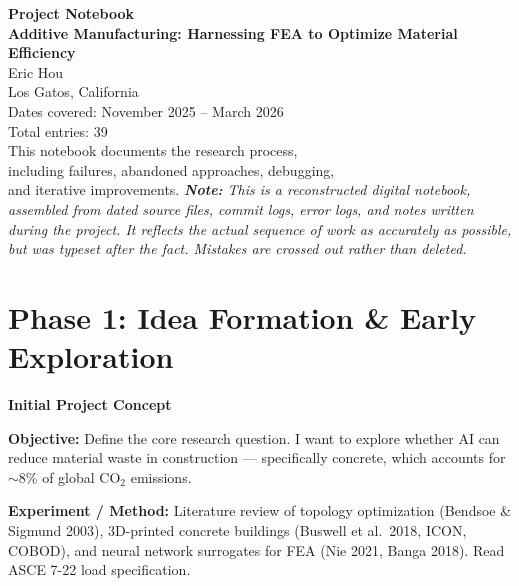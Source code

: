 \documentclass[11pt, letterpaper]{article}
\newcounter{entrynum}
\newcommand{\entry}[2]{%
  \refstepcounter{entrynum}%
  \vspace{6mm}%
  \noindent\begin{tcolorbox}[
    colback=bglight, colframe=entryblue,
    boxrule=1pt, arc=3pt,
    title={\textbf{Entry \theentrynum}\hfill\textbf{#1}},
    fonttitle=\large\color{white},
    colbacktitle=entryblue,
    left=3mm, right=3mm, top=2mm, bottom=2mm
  ]
  {\large\bfseries\color{entryblue} #2}
  \end{tcolorbox}
  \vspace{-1mm}%
}
\newcommand{\objective}{\par\textbf{\color{entryblue}Objective:} }
\newcommand{\experiment}{\par\textbf{\color{entryblue}Experiment / Method:} }
\begin{document}
\begin{titlepage}
  \centering
  \vspace*{3cm}
  {\Huge\bfseries\color{entryblue}
    Project Notebook}\\[6pt]
  {\LARGE\bfseries
    Additive Manufacturing: Harnessing FEA to Optimize Material Efficiency}\\[1.5cm]
  {\Large Eric Hou}\\[0.5cm]
  {\large Los Gatos, California}\\[2.5cm]
  {\large\color{notegray}
    Dates covered: November 2025 -- March 2026\\[4pt]
    Total entries: 39\\[4pt]
    This notebook documents the research process,\\
    including failures, abandoned approaches, debugging,\\
    and iterative improvements.}
  \vfill
  {\small\itshape
    \textbf{Note:} This is a reconstructed digital notebook, assembled
    from dated source files, commit logs, error logs, and notes
    written during the project. It reflects the actual sequence of
    work as accurately as possible, but was typeset after the fact.
    Mistakes are crossed out rather than deleted.}
\end{titlepage}

\tableofcontents
\newpage

\section{Phase 1: Idea Formation \& Early Exploration}

\entry{November 14, 2025}{Initial Project Concept}

\objective
Define the core research question. I want to explore whether AI can reduce
material waste in construction --- specifically concrete, which accounts for
$\sim$8\% of global CO$_2$ emissions.

\experiment
Literature review of topology optimization (Bendsoe \& Sigmund 2003),
3D-printed concrete buildings (Buswell et al.\ 2018, ICON, COBOD), and
neural network surrogates for FEA (Nie 2021, Banga 2018). Read ASCE 7-22
load specification.
\end{document}
